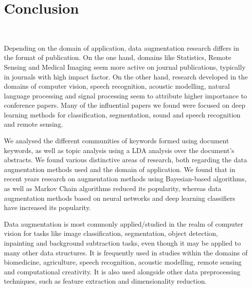 \documentclass[pdflatex,sn-mathphys]{sn-jnl}%
\theoremstyle{thmstyleone}
\theoremstyle{thmstyletwo}
\theoremstyle{thmstylethree}
\begin{document}
\section{Conclusion}~\label{sec:conclusion}

Depending on the domain of application, data augmentation research differs in
the format of publication. On the one hand, domains like Statistics, Remote
Sensing and Medical Imaging seem more active on journal publications,
typically in journals with high impact factor. On the other hand, research
developed in the domains of computer vision, speech recognition, acoustic
modelling, natural language processing and signal processing seem to attribute
higher importance to conference papers. Many of the influential papers we found
were focused on deep learning methods for classification, segmentation, sound
and speech recognition and remote sensing.

We analysed the different communities of keywords formed using document
keywords, as well as topic analysis using a LDA analysis over the document's
abstracts. We found various distinctive areas of research, both regarding the
data augmentation methods used and the domain of application. We found that in
recent years research on augmentation methods using Bayesian-based algorithms,
as well as Markov Chain algorithms reduced its popularity, whereas data
augmentation methods based on neural networks and deep learning classifiers
have increased its popularity.

Data augmentation is most commonly applied/studied in the realm of computer
vision for tasks like image classification, segmentation, object detection,
inpainting and background subtraction tasks, even though it may be applied to
many other data structures. It is frequently used in studies within the
domains of biomedicine, agriculture, speech recognition, acoustic modelling,
remote sensing and computational creativity. It is also used alongside other
data preprocessing techniques, such as feature extraction and dimensionality
reduction.
\end{document}
